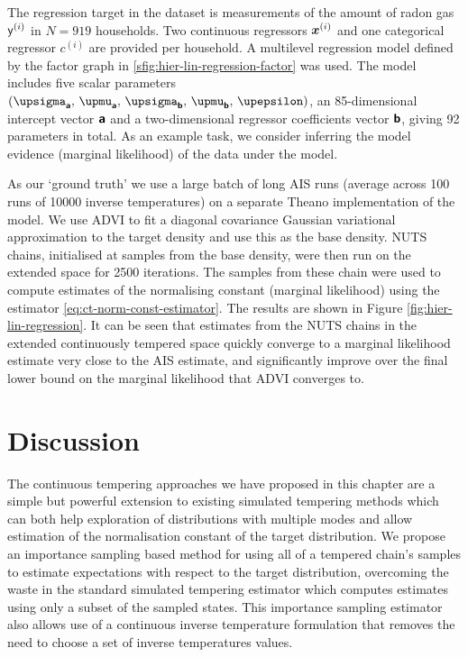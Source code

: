 The regression target in the dataset is measurements of the amount of radon gas $\mathsf{y}^{(i)}$ in $N=919$ households. Two continuous regressors $\boldsymbol{x}^{(i)}$ and one categorical regressor $c^{(i)}$ are provided per household. A multilevel regression model defined by the factor graph in \ref{sfig:hier-lin-regression-factor} was used. The model includes five scalar parameters $(\upsigma_{\rvct{a}},\,\upmu_{\rvct{a}},\,\upsigma_{\rvct{b}},\,\upmu_{\rvct{b}},\,\upepsilon)$, an 85-dimensional intercept vector $\boldsymbol{\mathsf{a}}$ and a two-dimensional regressor coefficients vector $\boldsymbol{\mathsf{b}}$, giving 92 parameters in total. As an example task, we consider inferring the model evidence (marginal likelihood) of the data under the model. %

As our `ground truth' we use a large batch of long \ac{AIS} runs (average across 100 runs of 10000 inverse temperatures) on a separate Theano implementation of the model. We use \ac{ADVI} to fit a diagonal covariance Gaussian variational approximation to the target density and use this as the base density. \ac{NUTS} chains, initialised at samples from the base density, were then run on the extended space for 2500 iterations. The samples from these chain were used to compute estimates of the normalising constant (marginal likelihood) using the estimator \eqref{eq:ct-norm-const-estimator}. The results are shown in Figure \ref{fig:hier-lin-regression}. It can be seen that estimates from the \ac{NUTS} chains in the extended continuously tempered space quickly converge to a marginal likelihood estimate very close to the \ac{AIS} estimate, and significantly improve over the final lower bound on the marginal likelihood that \ac{ADVI} converges to.

\section{Discussion}

The continuous tempering approaches we have proposed in this chapter are a simple but powerful extension to existing simulated tempering methods which can both help exploration of distributions with multiple modes and allow estimation of the normalisation constant of the target distribution. We propose an importance sampling based method for using all of a tempered chain's samples to estimate expectations with respect to the target distribution, overcoming the waste in the standard simulated tempering estimator which computes estimates using only a subset of the sampled states. This importance sampling estimator also allows use of a continuous inverse temperature formulation that removes the need to choose a set of inverse temperatures values.

